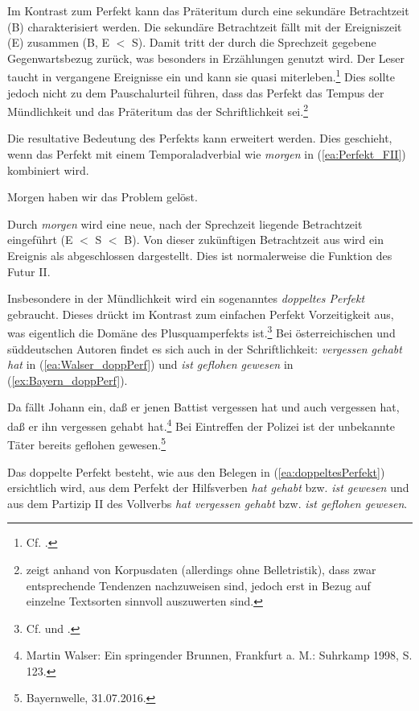 Im Kontrast zum Perfekt kann das Präteritum durch eine sekundäre Betrachtzeit (B) charakterisiert werden. Die sekundäre Betrachtzeit fällt mit der Ereigniszeit (E) zusammen (B, E $<$ S). Damit tritt der durch die Sprechzeit gegebene Gegenwartsbezug zurück, was besonders in Erzählungen genutzt wird. Der Leser taucht in vergangene Ereignisse ein und kann sie quasi miterleben.\footnote{Cf. \citet[90]{Sieberg1986}.} Dies sollte jedoch nicht zu dem Pauschalurteil führen, dass das Perfekt das Tempus der Mündlichkeit und das Präteritum das der Schriftlichkeit sei.\footnote{\citet[74--75]{Hennig2000} zeigt anhand von Korpusdaten (allerdings ohne Belletristik), dass zwar entsprechende Tendenzen nachzuweisen sind, jedoch erst in Bezug auf einzelne Textsorten sinnvoll auszuwerten sind.}

Die resultative Bedeutung des Perfekts kann erweitert werden. Dies geschieht, wenn das Perfekt mit einem Temporaladverbial wie \textit{morgen} in (\ref{ea:Perfekt_FII}) kombiniert wird.

\ea \label{ea:Perfekt_FII} Morgen haben wir das Problem gelöst.
\z 

Durch \textit{morgen} wird eine neue, nach der Sprechzeit liegende Betrachtzeit eingeführt (E $<$ S $<$ B). Von dieser zukünftigen Betrachtzeit aus wird ein Ereignis als abgeschlossen dargestellt. Dies ist normalerweise die Funktion des Futur II.

Insbesondere in der Mündlichkeit wird ein sogenanntes \textit{doppeltes Perfekt} gebraucht. Dieses drückt im Kontrast zum einfachen Perfekt Vorzeitigkeit aus, was eigentlich die Domäne des Plusquamperfekts ist.\footnote{Cf. \citet[214]{Thieroff1992} und \citet[167]{LitvinovRadcenko1998}.} Bei österreichischen und süddeutschen Autoren findet es sich auch in der Schriftlichkeit: \textit{vergessen gehabt hat} in (\ref{ea:Walser_doppPerf}) und \textit{ist geflohen gewesen} in (\ref{ex:Bayern_doppPerf}).

\ea \label{ea:doppeltesPerfekt}
\ea \label{ea:Walser_doppPerf} Da fällt Johann ein, daß er jenen Battist vergessen hat und auch vergessen hat, daß er ihn vergessen gehabt hat.\footnote{Martin Walser: Ein springender Brunnen, Frankfurt a. M.: Suhrkamp 1998, S. 123.}
\ex \label{ex:Bayern_doppPerf} Bei Eintreffen der Polizei ist der unbekannte Täter bereits geflohen gewesen.\footnote{Bayernwelle, 31.07.2016.}
\z 
\z 

Das doppelte Perfekt besteht, wie aus den Belegen in (\ref{ea:doppeltesPerfekt}) ersichtlich wird, aus dem Perfekt der Hilfsverben \textit{hat gehabt} bzw. \textit{ist gewesen} und aus dem Partizip II des Vollverbs \textit{hat vergessen gehabt} bzw. \textit{ist geflohen gewesen}.

